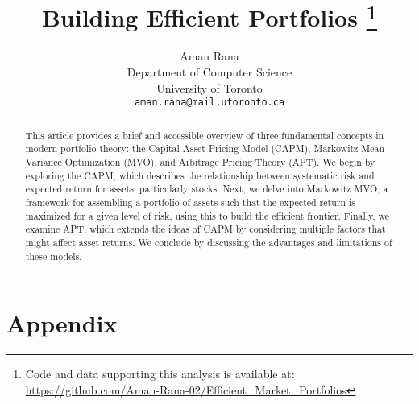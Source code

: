 \documentclass[11pt,a4paper,english]{article}
\date{\displaydate{date}}
\title{Building Efficient Portfolios
\thanks{Code and data supporting this analysis is available at: \url{https://github.com/Aman-Rana-02/Efficient_Market_Portfolios}}}
\author{%
  Aman Rana\\
  \small Department of Computer Science\\
  \small University of Toronto\\
  \small\texttt{aman.rana@mail.utoronto.ca}
}
\begin{document}
  \maketitle

  \begin{abstract}
    \noindent This article provides a brief and accessible overview of three fundamental concepts in modern portfolio theory: the Capital Asset Pricing Model (CAPM), Markowitz Mean-Variance Optimization (MVO), and Arbitrage Pricing Theory (APT). 
    We begin by exploring the CAPM, which describes the relationship between systematic risk and expected return for assets, particularly stocks. 
    Next, we delve into Markowitz MVO, a framework for assembling a portfolio of assets such that the expected return is maximized for a given level of risk, using this to build the efficient frontier.
     Finally, we examine APT, which extends the ideas of CAPM by considering multiple factors that might affect asset returns.
     We conclude by discussing the advantages and limitations of these models.
  \end{abstract}

  \newpage
  \tableofcontents

  \newpage

  

  
 
  

  

  

  

  \newpage
  
  

  \newpage
  \section*{Appendix}
  \renewcommand{\thesection}{\Alph{section}}
  \setcounter{section}{0}
  
\end{document}
